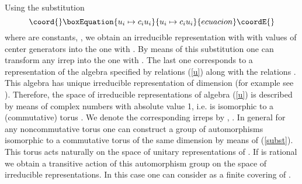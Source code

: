 \documentclass[a4paper,a4paper]{article}
\begin{document}
Using the substitution
\begin{equation}\coord{}\boxEquation{\label{subst}
u_{i} \mapsto c_{i} u_{i}
}{u_{i} \mapsto c_{i} u_{i}
}{ecuacion}\coordE{}\end{equation}
where \coordHE{} are constants, \coordHE{},  we obtain an irreducible representation with \coordHE{} 
with values of center generators \coordHE{} into the one with \coordHE{}. 
 By means of this substitution one can transform any irrep into the one with \coordHE{}. The last one corresponds to a representation of the 
algebra specified by relations (\ref{u}) along with the relations \coordHE{}.
 This algebra has 
 unique irreducible representation of dimension  \coordHE{} (for example see \cite{vanBaal}). 
Therefore, the space of irreducible representations of algebra (\ref{u}) is described by means of \coordHE{}
complex numbers \coordHE{} with absolute value 1, i.e. is isomorphic to a (commutative) torus \coordHE{}. 
We denote the corresponding 
irreps by \coordHE{}, \coordHE{}.
In general for any noncommutative torus \coordHE{} one can construct a group \coordHE{} of automorphisms isomorphic to 
a commutative torus of the same dimension by means of (\ref{subst}). This torus acts naturally on the space of 
unitary representations of \coordHE{}. If \myHighlight{$\theta$}\coordHE{} is rational we obtain a transitive action of this automorphism 
group on the space of irreducible representations. In this case one can consider \coordHE{} as a finite covering 
of \coordHE{}.
\end{document}
